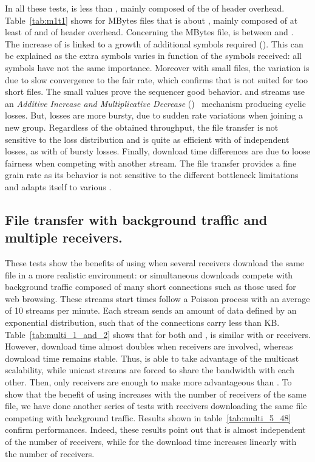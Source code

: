 \documentclass[a4paper]{article}
\begin{document}
        In all these tests,   is less than , mainly composed of
        the  of header overhead.
Table~\ref{tab:m1t1} shows for  MBytes files that   is
        about , mainly composed of at least  of  and 
        of header overhead.  Concerning the  MBytes file,   is
        between  and .  The increase of  is linked to a
        growth of additional  symbols required (). This can be
        explained as the  extra symbols varies in function of the
        symbols received: all symbols have not the same importance.  Moreover
        with small files, the  variation is due to  slow
        convergence to the fair rate, which confirms that  is not
        suited for too short files.
The small  values prove the sequencer good behavior.
 and  streams use an \textit{Additive Increase and
            Multiplicative Decrease} ()~\cite{yang_general_2000} mechanism
            producing cyclic losses.  But,  losses are more bursty, due to
            sudden rate variations when joining a new group.  Regardless of the
            obtained throughput, the file transfer is not sensitive to the loss
            distribution and is quite as efficient with  of independent
            losses, as with  of bursty losses.  Finally, download time
            differences are due to  loose fairness when competing with
            another  stream.
The file transfer provides a fine grain rate as its behavior is not
        sensitive to the different bottleneck limitations and adapts itself to
        various .

    \subsection{File transfer with background traffic and multiple receivers.}
        These tests show the benefits of using  when several receivers
        download the same file in a more realistic environment:  or 
        simultaneous downloads compete with background traffic composed of many
        short  connections such as those used for web browsing. These
        streams start times follow a Poisson process with an average of 10
        streams per minute. Each stream sends an amount of data defined by
        an exponential distribution, such that  of the connections carry
        less than KB.
Table~\ref{tab:multi_1_and_2} shows that for both  and
        ,  is similar with  or  receivers.  However,
         download time almost doubles when  receivers are involved,
        whereas  download time remains stable. Thus,  is able
        to take advantage of the multicast scalability, while unicast streams
        are forced to share the bandwidth with each other. Then, only 
        receivers are enough to make  more advantageous than .
To show that the benefit of using  increases with the
        number of receivers of the same file, we have done another series of
        tests with  receivers downloading the same  file competing
        with background traffic. Results shown in table~\ref{tab:multi_5_48}
        confirm  performances. Indeed, these results point out that
         is almost independent of the number of receivers, while for
         the download time increases linearly with the number of receivers.
\end{document}
